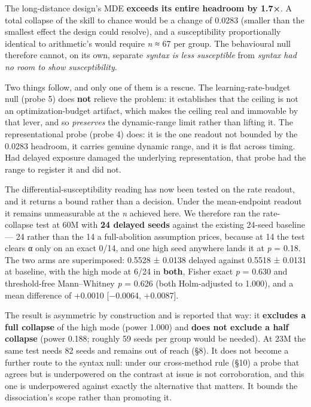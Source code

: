 \documentclass[11pt]{article}
\begin{document}
The long-distance design's MDE \textbf{exceeds its entire headroom by 1.7×}. A total collapse of
the skill to chance would be a change of 0.0283 (smaller than the smallest effect the
design could resolve), and a susceptibility proportionally identical to arithmetic's would
require \emph{n} ≈ 67 per group. The behavioural null therefore cannot, on its own, separate
\emph{syntax is less susceptible} from \emph{syntax had no room to show susceptibility}.

Two things follow, and only one of them is a rescue. The learning-rate-budget null (probe
5) does \textbf{not} relieve the problem: it establishes that the ceiling is not an
optimization-budget artifact, which makes the ceiling real and immovable by that lever, and
so \emph{preserves} the dynamic-range limit rather than lifting it. The representational probe
(probe 4) does: it is the one readout not bounded by the 0.0283 headroom, it carries
genuine dynamic range, and it is flat across timing. Had delayed exposure damaged the
underlying representation, that probe had the range to register it and did not.

The differential-susceptibility reading has now been tested on the rate readout, and it
returns a bound rather than a decision. Under the mean-endpoint readout it remains
unmeasurable at the \emph{n} achieved here. We therefore ran the rate-collapse test at 60M with
\textbf{24 delayed seeds} against the existing 24-seed baseline --- 24 rather than the 14 a
full-abolition assumption prices, because at 14 the test clears α only on an exact 0/14, and
one high seed anywhere lands it at \emph{p} = 0.18. The two arms are superimposed: 0.5528 ± 0.0138
delayed against 0.5518 ± 0.0131 at baseline, with the high mode at 6/24 in \textbf{both}, Fisher
exact \emph{p} = 0.630 and threshold-free Mann--Whitney \emph{p} = 0.626 (both Holm-adjusted to 1.000),
and a mean difference of +0.0010 {[}−0.0064, +0.0087{]}.

The result is asymmetric by construction and is reported that way: it \textbf{excludes a full
collapse} of the high mode (power 1.000) and \textbf{does not exclude a half collapse} (power
0.188; roughly 59 seeds per group would be needed). At 23M the same test needs 82 seeds and
remains out of reach (§8). It does not become a further route to the syntax null: under our
cross-method rule (§10) a probe that agrees but is underpowered on the contrast at issue is
not corroboration, and this one is underpowered against exactly the alternative that matters.
It bounds the dissociation's scope rather than promoting it.
\end{document}
